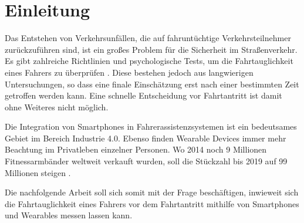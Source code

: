 \section{Einleitung}
\label{introduction}
Das Entstehen von Verkehrsunfällen, die auf fahruntüchtige Verkehrsteilnehmer zurückzuführen sind, ist ein großes Problem für die Sicherheit im Straßenverkehr. Es gibt zahlreiche Richtlinien und psychologische Tests, um die Fahrtauglichkeit eines Fahrers zu überprüfen \cite{drivervehiclelicencingagency,testverfahrenpsychometrischefahreignung,begutachtungsrichtlinien,beurteilungskriterien}. Diese bestehen jedoch aus langwierigen Untersuchungen, so dass eine finale Einschätzung erst nach einer bestimmten Zeit getroffen werden kann.   Eine schnelle Entscheidung vor Fahrtantritt ist damit ohne Weiteres nicht möglich.

Die Integration von Smartphones in Fahrerassistenzsystemen ist ein bedeutsames Gebiet im Bereich Industrie 4.0. Ebenso finden Wearable Devices immer mehr Beachtung im Privatleben einzelner Personen. Wo 2014 noch 9 Millionen Fitnessarmbänder weltweit verkauft wurden, soll die Stückzahl bis 2019 auf 99 Millionen steigen \cite{wearabletracking}. 

Die nachfolgende Arbeit soll sich somit mit der Frage beschäftigen, inwieweit sich die Fahrtauglichkeit eines Fahrers vor dem Fahrtantritt mithilfe von Smartphones und Wearables messen lassen kann. 

